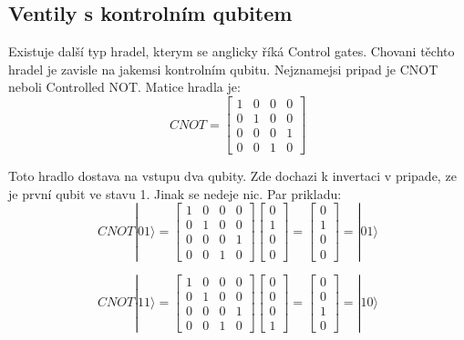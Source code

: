 \documentclass[11pt]{article}
\begin{document}
\subsection{Ventily s kontrolním qubitem}
Existuje další typ hradel, kterym se anglicky říká Control gates.
Chovani těchto hradel je zavisle na jakemsi kontrolním qubitu.
Nejznamejsi pripad je CNOT neboli Controlled NOT. Matice hradla je:
$$CNOT = \begin{bmatrix}
        1 & 0 & 0 & 0 \\
        0 & 1 & 0 & 0 \\
        0 & 0 & 0 & 1 \\
        0 & 0 & 1 & 0
    \end{bmatrix}$$
\par Toto hradlo dostava na vstupu dva qubity.
Zde dochazi k invertaci v pripade, ze je první qubit ve stavu 1.
Jinak se nedeje nic. Par prikladu:
$$CNOT|01\rangle = \begin{bmatrix}
        1 & 0 & 0 & 0 \\
        0 & 1 & 0 & 0 \\
        0 & 0 & 0 & 1 \\
        0 & 0 & 1 & 0
    \end{bmatrix}\begin{bmatrix}
        0 \\
        1 \\
        0 \\
        0
    \end{bmatrix} = \begin{bmatrix}
        0 \\
        1 \\
        0 \\
        0
    \end{bmatrix} = |01\rangle$$

$$CNOT|11\rangle = \begin{bmatrix}
        1 & 0 & 0 & 0 \\
        0 & 1 & 0 & 0 \\
        0 & 0 & 0 & 1 \\
        0 & 0 & 1 & 0
    \end{bmatrix}\begin{bmatrix}
        0 \\
        0 \\
        0 \\
        1
    \end{bmatrix} = \begin{bmatrix}
        0 \\
        0 \\
        1 \\
        0
    \end{bmatrix} = |10\rangle$$
\end{document}
